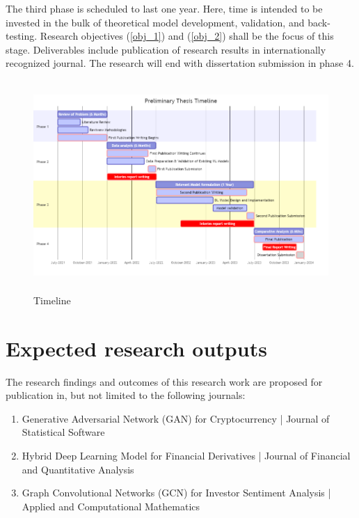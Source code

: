 \documentclass[a4paper,11pt]{scrartcl}
\begin{document}
The third phase is scheduled to last one year. Here, time is intended to be invested in the bulk of theoretical model development, validation, and back-testing. Research objectives (\ref{obj_1}) and (\ref{obj_2}) shall be the focus of this stage. Deliverables include publication of research results in internationally recognized journal. The research will end with dissertation submission in phase 4.
\begin{figure}[htb!]
    \centering
    \includegraphics[width=\textwidth,height=8cm]{graphics/mermaid-diagram-2.png}
    \caption{Timeline}
    \label{fig:my_label}
\end{figure}

\section{Expected research outputs}
The research findings and outcomes of this research work are proposed for publication in, but not limited to the following journals:
\begin{enumerate}
    \item Generative Adversarial Network (GAN) for Cryptocurrency | Journal of Statistical Software
    \item Hybrid Deep Learning Model for Financial Derivatives | Journal of Financial and Quantitative Analysis
    \item Graph Convolutional Networks (GCN) for Investor Sentiment Analysis | Applied and Computational Mathematics
\end{enumerate}



\end{document}
